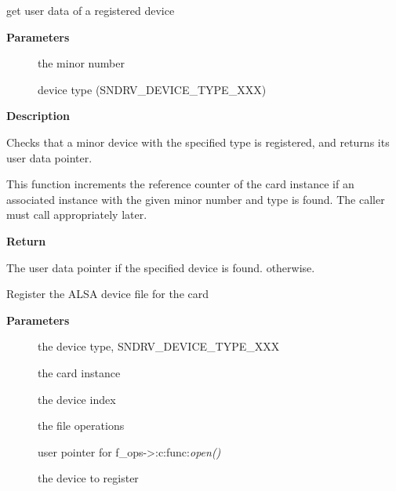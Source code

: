 \documentclass[a4paper,8pt,english]{sphinxmanual}
\begin{document}
\begin{fulllineitems}
\label{sound/kernel-api/alsa-driver-api:c.snd_lookup_minor_data}
get user data of a registered device

\end{fulllineitems}


\textbf{Parameters}
\begin{description}
\item[{}] \leavevmode
the minor number

\item[{}] \leavevmode
device type (SNDRV\_DEVICE\_TYPE\_XXX)

\end{description}

\textbf{Description}

Checks that a minor device with the specified type is registered, and returns
its user data pointer.

This function increments the reference counter of the card instance
if an associated instance with the given minor number and type is found.
The caller must call  appropriately later.

\textbf{Return}

The user data pointer if the specified device is found. 
otherwise.

\begin{fulllineitems}
\label{sound/kernel-api/alsa-driver-api:c.snd_register_device}
Register the ALSA device file for the card

\end{fulllineitems}


\textbf{Parameters}
\begin{description}
\item[{}] \leavevmode
the device type, SNDRV\_DEVICE\_TYPE\_XXX

\item[{}] \leavevmode
the card instance

\item[{}] \leavevmode
the device index

\item[{}] \leavevmode
the file operations

\item[{}] \leavevmode
user pointer for f\_ops-\textgreater{}:c:func:\emph{open()}

\item[{}] \leavevmode
the device to register

\end{description}
\end{document}
